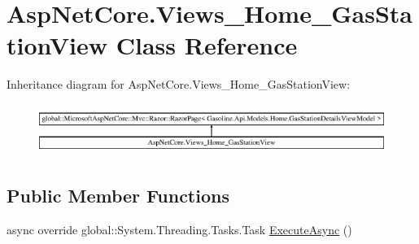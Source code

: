 \hypertarget{class_asp_net_core_1_1_views___home___gas_station_view}{}\section{Asp\+Net\+Core.\+Views\+\_\+\+Home\+\_\+\+Gas\+Station\+View Class Reference}
\label{class_asp_net_core_1_1_views___home___gas_station_view}
Inheritance diagram for Asp\+Net\+Core.\+Views\+\_\+\+Home\+\_\+\+Gas\+Station\+View\+:\begin{figure}[H]
\begin{center}
\leavevmode
\includegraphics[height=1.691843cm]{class_asp_net_core_1_1_views___home___gas_station_view}
\end{center}
\end{figure}
\subsection*{Public Member Functions}
\begin{DoxyCompactItemize}
\item 
async override global\+::\+System.\+Threading.\+Tasks.\+Task \mbox{\hyperlink{class_asp_net_core_1_1_views___home___gas_station_view_ae416524b32036b821169f08cbc7f6545}{Execute\+Async}} ()
\end{DoxyCompactItemize}
